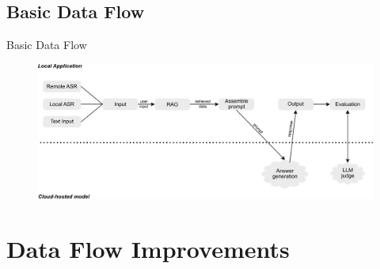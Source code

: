 \documentclass{sdqbeamer}[smallfoot]
\begin{document}
\subsection{Basic Data Flow}
\begin{frame}[t]{Basic Data Flow}
    \vspace{-1.5cm}
    \begin{figure}
        \centering
        \includegraphics[width=1.0\linewidth]{images/data_flow_basic.pdf}
    \end{figure}
\end{frame}

\section{Data Flow Improvements}
\end{document}
